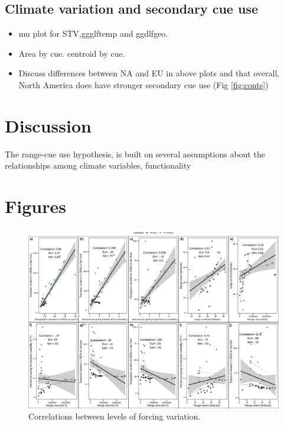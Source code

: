 \documentclass[11pt]{article}\usepackage[]{graphicx}\usepackage[]{color}
\begin{document}
\subsection*{Climate variation and secondary cue use}
\begin{itemize}
\item mu plot for STV,ggglftemp and ggdlfgeo.
\item Area by cue. centroid by cue.
\item Discuss differences between NA and EU in above plots and that overall, North America does have stronger secondary cue use (Fig \ref{fig:conts}) 
\end{itemize}
\section*{Discussion}
The range-cue use hypothesis, is built on several assumptions about the relationships among climate variables, functionality



\section*{Figures}
\begin{figure}[h!]
    \centering
 \includegraphics[width=\textwidth]{..//figures/clim_params.jpeg} 
    \caption{Correlations between levels of forcing variation. }
    \label{fig:climcor}
\end{figure}
\end{document}
